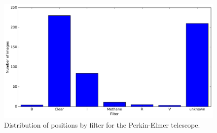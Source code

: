 \documentclass[12pt,a4paper]{report}
\newcommand{\PE}{Perkin-Elmer }
\begin{document}
\begin{figure}
\includegraphics[width=16.0cm]{filtro_160.png} 
\caption{Distribution of positions by filter for the \PE telescope.}
\label{Fig:filtro-160}
\end{figure}
\end{document}
